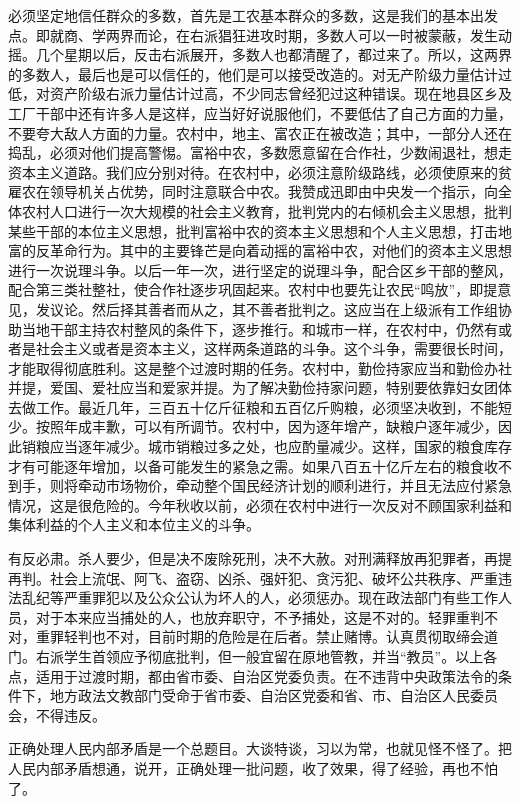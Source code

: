 必须坚定地信任群众的多数，首先是工农基本群众的多数，这是我们的基本出发点。即就商、学两界而论，在右派猖狂进攻时期，多数人可以一时被蒙蔽，发生动摇。几个星期以后，反击右派展开，多数人也都清醒了，都过来了。所以，这两界的多数人，最后也是可以信任的，他们是可以接受改造的。对无产阶级力量估计过低，对资产阶级右派力量估计过高，不少同志曾经犯过这种错误。现在地县区乡及工厂干部中还有许多人是这样，应当好好说服他们，不要低估了自己方面的力量，不要夸大敌人方面的力量。农村中，地主、富农正在被改造；其中，一部分人还在捣乱，必须对他们提高警惕。富裕中农，多数愿意留在合作社，少数闹退社，想走资本主义道路。我们应分别对待。在农村中，必须注意阶级路线，必须使原来的贫雇农在领导机关占优势，同时注意联合中农。我赞成迅即由中央发一个指示，向全体农村人口进行一次大规模的社会主义教育，批判党内的右倾机会主义思想，批判某些干部的本位主义思想，批判富裕中农的资本主义思想和个人主义思想，打击地富的反革命行为。其中的主要锋芒是向着动摇的富裕中农，对他们的资本主义思想进行一次说理斗争。以后一年一次，进行坚定的说理斗争，配合区乡干部的整风，配合第三类社整社，使合作社逐步巩固起来。农村中也要先让农民“鸣放”，即提意见，发议论。然后择其善者而从之，其不善者批判之。这应当在上级派有工作组协助当地干部主持农村整风的条件下，逐步推行。和城市一样，在农村中，仍然有或者是社会主义或者是资本主义，这样两条道路的斗争。这个斗争，需要很长时间，才能取得彻底胜利。这是整个过渡时期的任务。农村中，勤俭持家应当和勤俭办社并提，爱国、爱社应当和爱家并提。为了解决勤俭持家问题，特别要依靠妇女团体去做工作。最近几年，三百五十亿斤征粮和五百亿斤购粮，必须坚决收到，不能短少。按照年成丰歉，可以有所调节。农村中，因为逐年增产，缺粮户逐年减少，因此销粮应当逐年减少。城市销粮过多之处，也应酌量减少。这样，国家的粮食库存才有可能逐年增加，以备可能发生的紧急之需。如果八百五十亿斤左右的粮食收不到手，则将牵动市场物价，牵动整个国民经济计划的顺利进行，并且无法应付紧急情况，这是很危险的。今年秋收以前，必须在农村中进行一次反对不顾国家利益和集体利益的个人主义和本位主义的斗争。

有反必肃。杀人要少，但是决不废除死刑，决不大赦。对刑满释放再犯罪者，再提再判。社会上流氓、阿飞、盗窃、凶杀、强奸犯、贪污犯、破坏公共秩序、严重违法乱纪等严重罪犯以及公众公认为坏人的人，必须惩办。现在政法部门有些工作人员，对于本来应当捕处的人，也放弃职守，不予捕处，这是不对的。轻罪重判不对，重罪轻判也不对，目前时期的危险是在后者。禁止赌博。认真贯彻取缔会道门。右派学生首领应予彻底批判，但一般宜留在原地管教，并当“教员”。以上各点，适用于过渡时期，都由省市委、自治区党委负责。在不违背中央政策法令的条件下，地方政法文教部门受命于省市委、自治区党委和省、市、自治区人民委员会，不得违反。

正确处理人民内部矛盾是一个总题目。大谈特谈，习以为常，也就见怪不怪了。把人民内部矛盾想通，说开，正确处理一批问题，收了效果，得了经验，再也不怕了。

